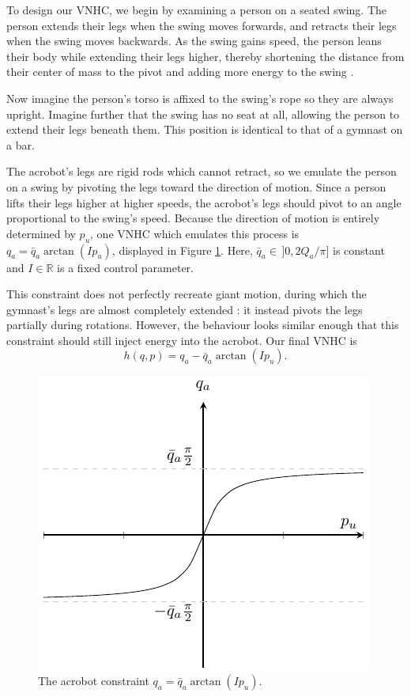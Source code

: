\documentclass[journal,twoside,web]{ieeecolor}
\newcommand*{\R}{\mathbb{R}}
\begin{document}
To design our VNHC, we begin by examining a person on a
seated swing.
The person extends their legs when the swing moves forwards, and retracts their
legs when the swing moves backwards.
As the swing gains speed, the person leans their body while
extending their legs higher, thereby shortening the distance
from their center of mass to the pivot and adding more energy to the swing
\cite{how_to_pump_a_swing}.

Now imagine the person's torso is affixed to the swing's rope so they are
always upright. 
Imagine further that the swing has no seat at all, allowing the person to extend
their legs beneath them. 
This position is identical to that of a gymnast on a bar.

The acrobot's legs are rigid rods which cannot retract, so we emulate the person
on a swing by pivoting the legs toward the direction of motion. 
Since a person lifts their legs higher at higher speeds, the acrobot's legs should
pivot to an angle proportional to the swing's speed.
Because the direction of motion is entirely determined by \(p_u\), 
one VNHC which emulates this process is \(q_a = \bar{q}_a\arctan( I p_u)\),
displayed in Figure \ref{fig:qa-arctan}.
Here, \(\bar{q}_a \in \, ]0,2 Q_a/\pi]\) is constant and \(I \in \R\) is a fixed
control parameter.

This constraint does not perfectly recreate giant motion, during which
the gymnast's legs are almost completely extended \cite{usagym_giant}:
it instead pivots the legs partially during rotations.
However, the behaviour looks similar enough that this constraint should 
still inject energy into the acrobot.
Our final VNHC is
\begin{equation}\label{eqn:acrobot-constraint}
    h(q,p) = q_a - \bar{q}_a \arctan(I p_u)
    .
\end{equation}

\begin{figure}
    \centering
    \includegraphics[width=0.7\linewidth]{qa_arctan.pdf}
    \caption{The acrobot constraint \(q_a = \bar{q}_a \arctan(I p_u)\).}
    \label{fig:qa-arctan}
\end{figure}
\end{document}
